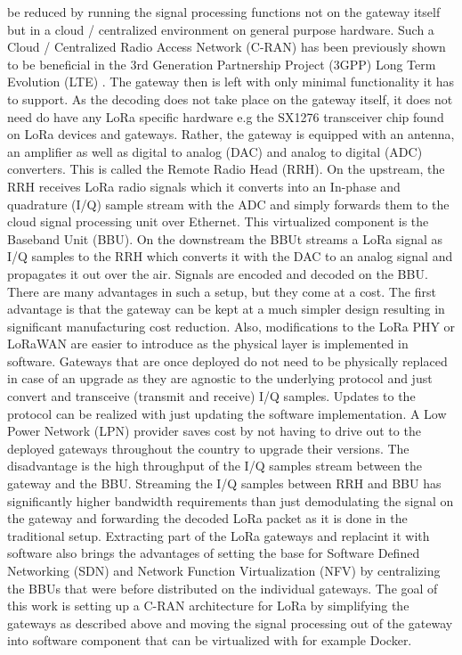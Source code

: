 be reduced by running the signal processing functions not on the gateway itself but in a cloud / centralized environment on general purpose hardware. Such a Cloud / Centralized Radio
Access Network (C-RAN) has been previously shown to be beneficial in the 3rd Generation Partnership
Project (3GPP) Long Term Evolution (LTE) \cite{Sousa2016}. The gateway then is left with only minimal functionality it has to support.
As the decoding does not take place on the gateway itself, it does not need do have any LoRa specific hardware e.g the SX1276 transceiver chip
found on LoRa devices and gateways. Rather, the gateway is equipped with an antenna, an amplifier as well as digital to analog (DAC) and 
analog to digital (ADC) converters. This is called the Remote Radio Head (RRH). On the upstream, the RRH receives LoRa radio signals which it converts into an In-phase and quadrature 
(I/Q) sample stream with the ADC and simply forwards them to the cloud signal processing unit over Ethernet. This virtualized component is the Baseband Unit (BBU).
On the downstream the BBUt streams a LoRa signal as I/Q samples to the RRH which converts it with the DAC to an analog signal and 
propagates it out over the air. Signals are encoded and decoded on the BBU. There are many advantages in such 
a setup, but they come at a cost. The first advantage is that the gateway can be kept at a much simpler design resulting in significant manufacturing
cost reduction. Also, modifications to the LoRa PHY or LoRaWAN are easier to introduce as the physical layer is implemented in software. 
Gateways that are once deployed do not need to be physically replaced in case of an upgrade as they are agnostic to the underlying protocol and
just convert and transceive (transmit and receive) I/Q samples. Updates to the protocol can be realized with just updating the software implementation. 
A Low Power Network (LPN) provider saves cost by not having to drive out to the deployed gateways throughout the country to upgrade their versions.
The disadvantage is the high throughput of the I/Q samples stream between the gateway and the BBU. Streaming the I/Q samples between RRH and BBU 
has significantly higher bandwidth requirements than just demodulating the signal on the gateway and forwarding the decoded LoRa packet as it is done 
in the traditional setup. Extracting part of the LoRa gateways and replacint it with software also brings the advantages of setting the base for Software Defined Networking (SDN) and 
Network Function Virtualization (NFV) by centralizing the BBUs that were before distributed on the individual gateways.
The goal of this work is setting up a C-RAN architecture for LoRa by simplifying the gateways as described above and moving the signal processing out of the 
gateway into software component that can be virtualized with for example Docker.






